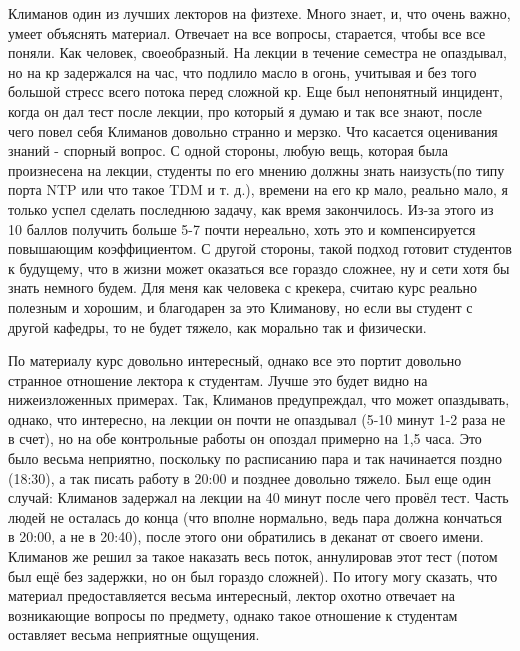             \begin{commentbox} 
                Климанов один из лучших лекторов на физтехе. Много знает, и, что очень важно, умеет объяснять материал. Отвечает на все вопросы, старается, чтобы все все поняли. Как человек, своеобразный. На лекции в течение семестра не опаздывал, но на кр задержался на час, что подлило масло в огонь, учитывая и без того большой стресс всего потока перед сложной кр. Еще был непонятный инцидент, когда он дал тест после лекции, про который я думаю и так все знают, после чего повел себя Климанов довольно странно и мерзко. Что касается оценивания знаний - спорный вопрос. С одной стороны, любую вещь, которая была произнесена на лекции, студенты по его мнению должны знать наизусть(по типу порта NTP или что такое TDM и т. д.), времени на его кр мало, реально мало, я только успел сделать последнюю задачу, как время закончилось. Из-за этого из 10 баллов получить больше 5-7 почти нереально, хоть это и компенсируется повышающим коэффициентом. С другой стороны, такой подход готовит студентов к будущему, что в жизни может оказаться все гораздо сложнее, ну и сети хотя бы знать немного будем. Для меня как человека с крекера, считаю курс реально полезным и хорошим, и благодарен за это Климанову,  но если вы студент с другой кафедры, то не будет тяжело, как морально так и физически. 
            \end{commentbox} 
        
            \begin{commentbox} 
                По материалу курс довольно интересный, однако все это портит довольно странное отношение лектора к студентам. Лучше это будет видно на нижеизложенных примерах. Так, Климанов предупреждал, что может опаздывать, однако, что интересно, на лекции он почти не опаздывал (5-10 минут 1-2 раза не в счет), но на обе контрольные работы он опоздал примерно на 1,5 часа. Это было весьма неприятно, поскольку по расписанию пара и так начинается поздно (18:30), а так писать работу в 20:00 и позднее довольно тяжело. Был еще один случай: Климанов задержал на лекции на 40 минут после чего провёл тест. Часть людей не осталась до конца (что вполне нормально, ведь пара должна кончаться в 20:00, а не в 20:40), после этого они обратились в деканат от своего имени. Климанов же решил за такое наказать весь поток, аннулировав этот тест (потом был ещё без задержки, но он был гораздо сложней). По итогу могу сказать, что материал предоставляется весьма интересный, лектор охотно отвечает на возникающие вопросы по предмету, однако такое отношение к студентам оставляет весьма неприятные ощущения. 
            \end{commentbox} 
        
